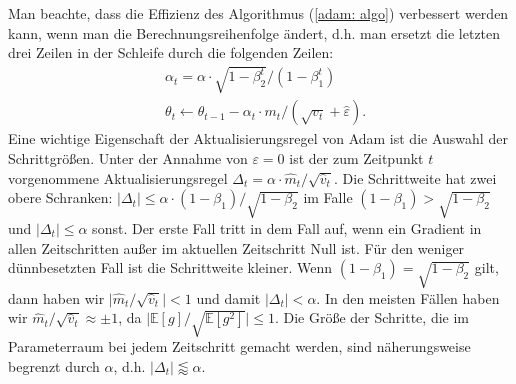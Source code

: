 \documentclass[12pt,titlepage,headsepline]{article}
\begin{document}
      \hfill\break
      Man beachte, dass die Effizienz des Algorithmus (\ref{adam: algo}) verbessert werden kann, wenn man die Berechnungsreihenfolge ändert, d.h. man ersetzt die letzten drei Zeilen in der Schleife durch die folgenden Zeilen:
      \begin{align*}
        & \alpha_t = \alpha \cdot \sqrt{1-\beta_2^t}/(1-\beta_1^t) \\
        & \theta_t \leftarrow \theta_{t-1} - \alpha_t \cdot m_t / (\sqrt{v_t}+\hat \varepsilon).
      \end{align*}
      Eine wichtige Eigenschaft der Aktualisierungsregel von Adam ist die Auswahl der Schrittgrößen. Unter der Annahme von $\varepsilon = 0$ ist der zum Zeitpunkt $t$ vorgenommene Aktualisierungsregel $\Delta_t = \alpha \cdot \hat m_t / \sqrt{\hat v_t}$. Die Schrittweite hat zwei obere Schranken: $\lvert \Delta_t \rvert \leq \alpha \cdot (1-\beta_1) / \sqrt{1-\beta_2}$ im Falle $(1-\beta_1) > \sqrt{1-\beta_2}$ und $\lvert \Delta_t \rvert \leq \alpha$ sonst. Der erste Fall tritt in dem Fall auf, wenn ein Gradient in allen Zeitschritten außer im aktuellen Zeitschritt Null ist. Für den weniger dünnbesetzten Fall ist die Schrittweite kleiner. Wenn $(1-\beta_1) = \sqrt{1-\beta_2}$ gilt, dann haben wir $\lvert \hat m_t / \sqrt{\hat v_t} \rvert < 1$ und damit $\lvert \Delta_t \rvert < \alpha$. In den meisten Fällen haben wir $\hat m_t / \sqrt{\hat v_t} \approx \pm 1$, da $\lvert \mathbb{E}[g]/ \sqrt{\mathbb{E}[g^2]} \rvert \leq 1$. Die Größe der Schritte, die im Parameterraum bei jedem Zeitschritt gemacht werden, sind näherungsweise begrenzt durch $\alpha$, d.h. $\lvert \Delta_t \rvert \lessapprox \alpha$. %
\end{document}
